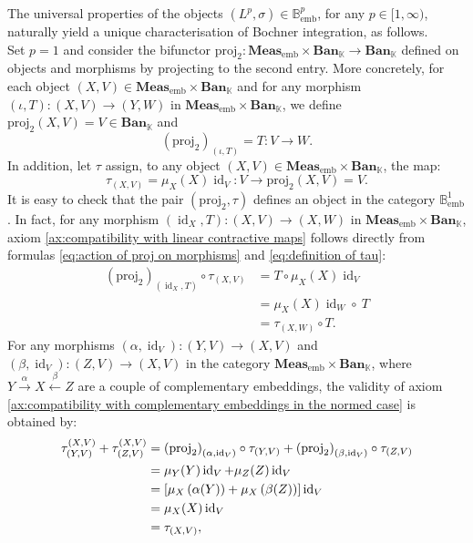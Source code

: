 \documentclass{amsart}
\theoremstyle{definition}
\theoremstyle{plain}
\newcommand{\id}{\operatorname{id}}
\newcommand{\embMeas}{\mathbf{Meas}_\mathrm{emb}}
\newcommand{\Ban}{\mathbf{Ban}_{\mathbb{K}}}
\newcommand{\Bembp}{\mathbb{B}_{\mathrm{emb}}^p}
\newcommand{\proj}{\mathrm{proj}_{2}}
\newcommand{\Bemb}{\mathbb{B}_{\mathrm{emb}}^1}
\begin{document}
        The universal properties of the objects $(L^p,\sigma) \in \Bembp$, for any $p \in [1,\infty)$, naturally yield a unique characterisation of Bochner integration, as follows. \\
        Set $p = 1$ and consider the bifunctor $\proj \colon \embMeas \times \Ban \rightarrow \Ban$ defined on objects and morphisms by projecting to the second entry. 
        More concretely, for each object $(X,V) \in \embMeas \times \Ban$ and for any morphism $(\iota,T) \colon (X,V) \rightarrow (Y,W)$ in $\embMeas \times \Ban$, we define $\proj(X,V) = V \in \Ban$ and
        \begin{equation}
        \label{eq:action of proj on morphisms}
            \left( \proj \right)_{(\iota,T)} = T \colon V \rightarrow W.
        \end{equation}
        In addition, let $\tau$ assign, to any object $(X,V) \in \embMeas \times \Ban$, the map:
        \begin{equation}
        \label{eq:definition of tau}
            \tau_{(X,V)} = \mu_X(X) \id_V \colon V \rightarrow \proj(X,V) = V.
        \end{equation}
        It is easy to check that the pair $(\proj,\tau)$ defines an object in the category $\Bemb$.
        In fact, for any morphism $(\id_X,T) \colon (X,V) \rightarrow (X,W)$ in $\embMeas \times \Ban$, axiom \ref{ax:compatibility with linear contractive maps} follows directly from formulas \eqref{eq:action of proj on morphisms} and \eqref{eq:definition of tau}:
        \begin{equation*}
            \begin{split}
                \left( \proj \right)_{(\id_X,T)} \circ \tau_{(X,V)} &= T \circ \mu_X(X) \id_V \\
                &= \mu_X(X) \id_W \circ ~ T \\
                &= \tau_{(X,W)} \circ T.
            \end{split}
        \end{equation*}
        For any morphisms $(\alpha,\id_V) \colon (Y,V) \rightarrow (X,V)$ and $(\beta,\id_V) \colon (Z,V) \rightarrow (X,V)$ in the category $\embMeas \times \Ban$, where $Y \xrightarrow{~\alpha~} X \xleftarrow{~\beta~} Z$ are a couple of complementary embeddings, the validity of axiom \ref{ax:compatibility with complementary embeddings in the normed case} is obtained by:  
        \begin{align}
                \tau_{(Y,V)}^{(X,V)} + \tau_{(Z,V)}^{(X,V)} &= \left( \proj \right)_{(\alpha,\id_V)} \circ \tau_{(Y,V)} + \left( \proj \right)_{(\beta,\id_V)} \circ \tau_{(Z,V)} \notag \\
                &= \mu_Y(Y) \id_V + \mu_Z(Z) \id_V \notag \\
                &= \left[ \mu_X\left( \alpha(Y) \right) + \mu_X\left( \beta(Z) \right)\right] \id_V \label{eq:use that embeddings preserve measures} \\
                &= \mu_X(X) \id_V \label{eq:use that alpha and beta are complementary embeddings} \\
                &= \tau_{(X,V)} \notag,
        \end{align}
\end{document}
